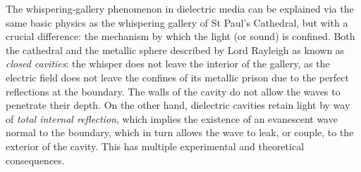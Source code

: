 The whispering-gallery phenomenon in dielectric media can be explained
via the same basic physics as the whispering gallery of St Paul's Cathedral, 
but with a crucial difference: the mechanism by which the light (or sound) is confined.
Both the cathedral and the metallic sphere described by Lord Rayleigh as known as 
\textit{closed cavities}: the whisper does not leave the interior of the gallery,
as the electric field does not leave the confines of its metallic prison due to the perfect
reflections at the boundary. The walls of the cavity do not allow the waves to penetrate their depth. 
On the other hand, dielectric cavities retain light by way of \textit{total internal reflection}, which
implies the existence of an evanescent wave normal to the boundary, which in turn
allows the wave to leak, or couple, to the exterior of the cavity. This has multiple
experimental and theoretical consequences. 


